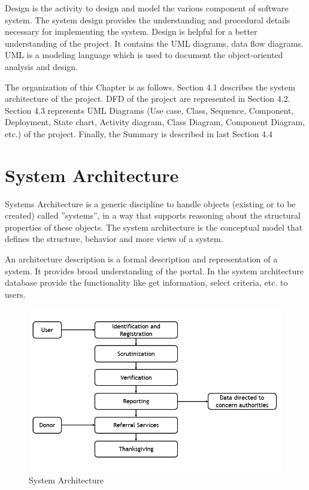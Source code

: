 Design is the activity to design and model the various component of software system. The system design provides the understanding and procedural details necessary for implementing the system. Design is helpful for a better understanding of the project. It contains the UML diagrams, data flow diagrams. UML is a modeling language which is used to document the object-oriented analysis and design.

The organization of this Chapter is as follows. Section 4.1 describes the system architecture of the project. DFD of the project are represented in Section 4.2. Section 4.3 represents UML Diagrams (Use case, Class, Sequence, Component, Deployment, State chart, Activity diagram, Class Diagram,  Component Diagram,  etc.)  of the project.  Finally,  the Summary is described in last Section 4.4

\section{System Architecture}
Systems Architecture is a generic discipline to handle objects (existing or to be created) called ”systems”, in a way that supports reasoning about the structural properties of these objects. The system architecture is the conceptual model that defines the structure, behavior and more views of a system.

An architecture description is a formal description and representation of a system. It provides broad understanding of the portal. In the system architecture database provide the functionality like get information, select criteria, etc. to users.\\
\newpage
  \begin{figure}
    \centering
    \includegraphics[width= 18cm,scale=0.70]{design/system arch.png}
    \caption{System Architecture }
    \label{fig:my_label}
  \end{figure}
    
